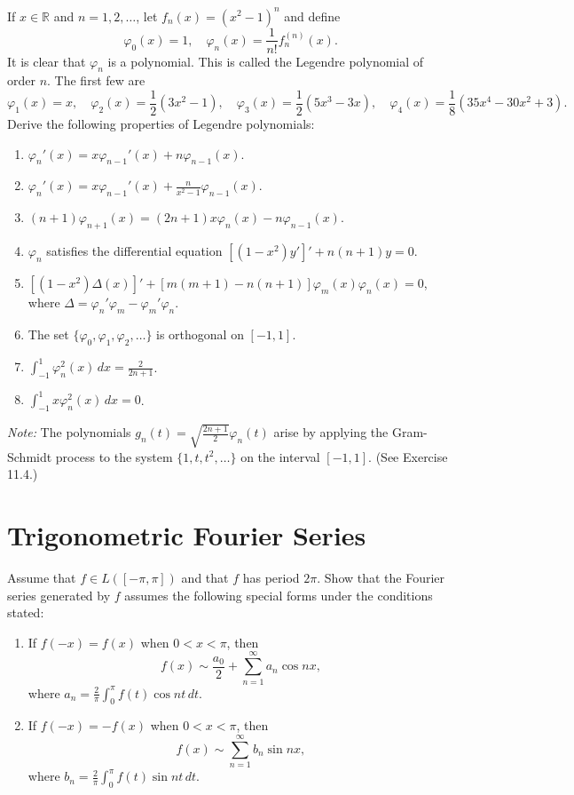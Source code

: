 \begin{problembox}
If $x \in \mathbb{R}$ and $n = 1, 2, \dots$, let $f_n(x) = (x^2 - 1)^n$ and define
\[
\varphi_0(x) = 1, \quad \varphi_n(x) = \frac{1}{n!} f_n^{(n)}(x).
\]
It is clear that $\varphi_n$ is a polynomial. This is called the Legendre polynomial of order $n$. The first few are
\[
\varphi_1(x) = x, \quad \varphi_2(x) = \frac{1}{2}(3x^2 - 1), \quad \varphi_3(x) = \frac{1}{2}(5x^3 - 3x), \quad \varphi_4(x) = \frac{1}{8}(35x^4 - 30x^2 + 3).
\]
Derive the following properties of Legendre polynomials:
\begin{enumerate}[label=(\alph*)]
\item $\varphi_n'(x) = x \varphi_{n-1}'(x) + n \varphi_{n-1}(x)$.
\item $\varphi_n'(x) = x \varphi_{n-1}'(x) + \frac{n}{x^2 - 1} \varphi_{n-1}(x)$.
\item $(n + 1) \varphi_{n+1}(x) = (2n + 1) x \varphi_n(x) - n \varphi_{n-1}(x)$.
\item $\varphi_n$ satisfies the differential equation $[(1 - x^2) y']' + n(n + 1) y = 0$.
\item $[(1 - x^2) \Delta(x)]' + [m(m + 1) - n(n + 1)] \varphi_m(x) \varphi_n(x) = 0$, where $\Delta = \varphi_n' \varphi_m - \varphi_m' \varphi_n$.
\item The set $\{\varphi_0, \varphi_1, \varphi_2, \dots\}$ is orthogonal on $[-1, 1]$.
\item $\int_{-1}^1 \varphi_n^2(x) \, dx = \frac{2}{2n + 1}$.
\item $\int_{-1}^1 x \varphi_n^2(x) \, dx = 0$.
\end{enumerate}
\textit{Note:} The polynomials $g_n(t) = \sqrt{\frac{2n + 1}{2}} \varphi_n(t)$ arise by applying the Gram-Schmidt process to the system $\{1, t, t^2, \dots\}$ on the interval $[-1, 1]$. (See Exercise 11.4.)
\end{problembox}

\section{Trigonometric Fourier Series}

\begin{problembox}
Assume that $f \in L([-\pi, \pi])$ and that $f$ has period $2\pi$. Show that the Fourier series generated by $f$ assumes the following special forms under the conditions stated:
\begin{enumerate}[label=(\alph*)]
\item If $f(-x) = f(x)$ when $0 < x < \pi$, then
\[
f(x) \sim \frac{a_0}{2} + \sum_{n=1}^\infty a_n \cos nx,
\]
where $a_n = \frac{2}{\pi} \int_0^\pi f(t) \cos nt \, dt$.
\item If $f(-x) = -f(x)$ when $0 < x < \pi$, then
\[
f(x) \sim \sum_{n=1}^\infty b_n \sin nx,
\]
where $b_n = \frac{2}{\pi} \int_0^\pi f(t) \sin nt \, dt$.
\end{enumerate}
\end{problembox}

